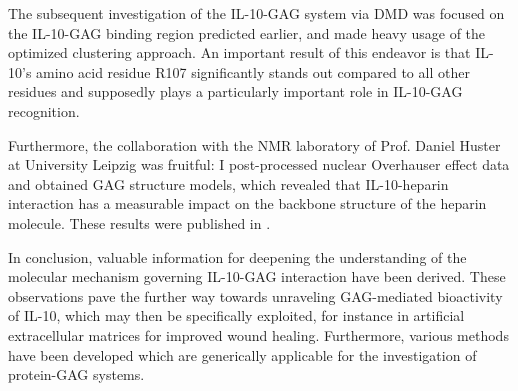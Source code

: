 The subsequent investigation of the IL-10-GAG system via DMD was focused on the
IL-10-GAG binding region predicted earlier, and made heavy usage of the
optimized clustering approach. An important result of this endeavor is that
IL-10's amino acid residue R107 significantly stands out compared to all other
residues and supposedly plays a particularly important role in IL-10-GAG
recognition.

Furthermore, the collaboration with the NMR laboratory of Prof. Daniel Huster at
University Leipzig was fruitful: I post-processed nuclear Overhauser effect data
and obtained GAG structure models, which revealed that IL-10-heparin interaction
has a measurable impact on the backbone structure of the heparin molecule. These
results were published in \cite{kuenze_gehrcke_2014}.

In conclusion, valuable information for deepening the understanding of the
molecular mechanism governing IL-10-GAG interaction have been derived. These
observations pave the further way towards unraveling GAG-mediated bioactivity of
IL-10, which may then be specifically exploited, for instance in artificial
extracellular matrices for improved wound healing. Furthermore, various methods
have been developed which are generically applicable for the investigation of
protein-GAG systems.

